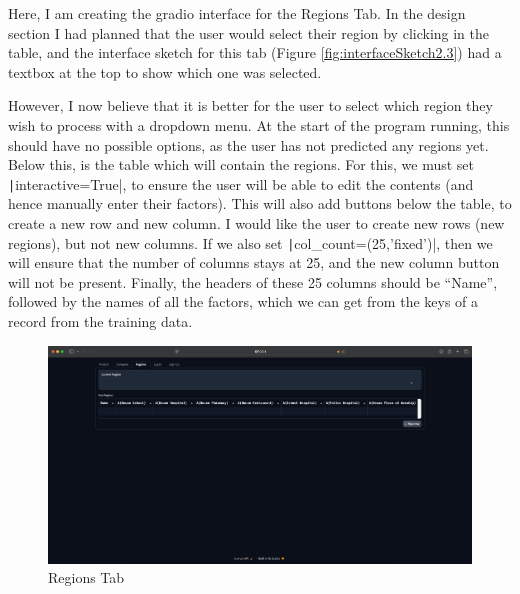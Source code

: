 \documentclass[12pt]{report}
\newcommand{\pil}[1]{\protect\texttt|#1|}
\begin{document}
Here, I am creating the gradio interface for the Regions Tab. In the design section I had planned that the user would select their region by clicking in the table, and the interface sketch for this tab (Figure \ref{fig:interfaceSketch2.3}) had a textbox at the top to show which one was selected.

However, I now believe that it is better for the user to select which region they wish to process with a dropdown menu. At the start of the program running, this should have no possible options, as the user has not predicted any regions yet. Below this, is the table which will contain the regions. For this, we must set \pil{interactive=True}, to ensure the user will be able to edit the contents (and hence manually enter their factors). This will also add buttons below the table, to create a new row and new column. I would like the user to create new rows (new regions), but not new columns. If we also set \pil{col_count=(25,'fixed')}, then we will ensure that the number of columns stays at 25, and the new column button will not be present. Finally, the headers of these 25 columns should be ``Name'', followed by the names of all the factors, which we can get from the keys of a record from the training data.

\begin{figure}[H]
\centering
\includegraphics[width=14cm]{ss20.1.png}
\caption{Regions Tab}\label{fig:ss20.1}
\end{figure}

\begin{center}
\end{center}
\end{document}
